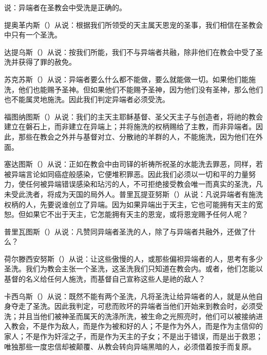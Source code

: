 说：异端者在圣教会中受洗是正确的。\par

提奥革内斯（）从说：根据我们所领受的天主属天恩宠的圣事，我们相信在圣教会中只有一个圣洗。\par

达提乌斯（）从说：按我们所能，我们不与异端者共融，除非他们在教会中受了圣洗并获得了罪的赦免。\par

苏克苏斯（）从说：异端者要么什么都不能做，要么就能做一切。如果他们能施洗，他们也能赐予圣神。但如果他们不能赐予圣神，因为他们没有圣神，那么他们也不能属灵地施洗。因此我们判定异端者必须受洗。\par

福图纳图斯（）从说：我们的主天主耶稣基督、圣父天主子与创造者，将祂的教会建立在磐石上，而非建立在异端上；并将施洗的权柄赐给了主教，而非异端者。因此，那些在教会之外并与基督对立、分散祂的羊群的人，不能施洗，因为他们在外面。\par

塞达图斯（）从说：正如在教会中由司铎的祈祷所祝圣的水能洗去罪恶，同样，若被异端言论如同癌症般感染，它便堆积罪恶。因此我们必须以一切和平的力量努力，使任何被异端错误感染和玷污的人，不可拒绝接受教会唯一而真实的圣洗，凡未受此洗者，将成为天国的局外人。普里瓦提亚努斯（）从说：凡说异端者有施洗权柄的人，先要说谁创立了异端。因为如果异端出于天主，它也可能拥有天主的宽恕。但如果它不出于天主，它怎能拥有天主的恩宠，或将恩宠赐予任何人呢？\par

普里瓦图斯（）从说：凡赞同异端者圣洗的人，除了与异端者共融外，还做了什么？\par

荷尔滕西安努斯（）从说：让这些傲慢的人，或那些偏袒异端者的人，思考有多少圣洗。我们为教会主张一个圣洗，这圣洗我们只知道在教会内。或者，他们怎能以基督的名义给任何人施洗，而基督自己宣称这些人是祂的敌人？\par

卡西乌斯（）从说：既然不能有两个圣洗，凡将圣洗让给异端者的人，就是从他自身夺走了圣洗。因此我判定，可悲而败坏的异端者当他们开始来到教会时，必须受洗；并且当他们被神圣而属天的洗涤所洗，被生命之光照亮时，他们可以被接纳进入教会，不是作为敌人，而是作为被和好的人；不是作为外人，而是作为主信仰的家人；不是作为奸淫之子，而是作为天主的子女；不是出于错误，而是出于救恩；唯独那些一度忠信却被颠覆、从教会转向异端黑暗的人，必须借着按手而复原。\par


